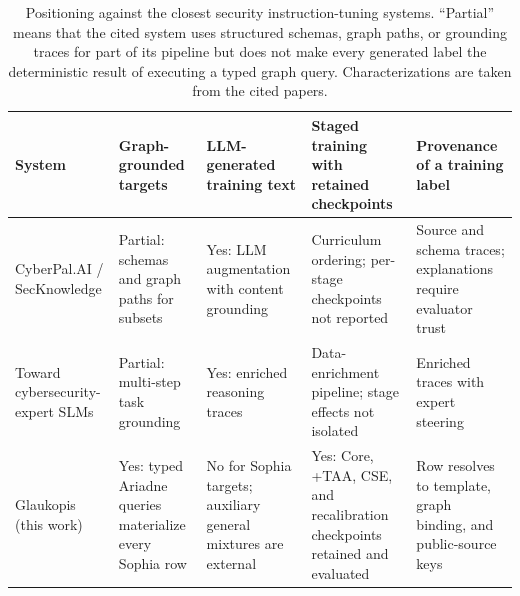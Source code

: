 \documentclass[twocolumn]{svjour3}
\begin{document}
\begin{table}
\centering\footnotesize
\caption{Positioning against the closest security instruction-tuning systems. ``Partial'' means that the cited system uses structured schemas, graph paths, or grounding traces for part of its pipeline but does not make every generated label the deterministic result of executing a typed graph query. Characterizations are taken from the cited papers.}\label{tab:positioning}
\begin{tabularx}{\textwidth}{@{}P{2.6cm}XXXX@{}}
\toprule
System & Graph-grounded targets & LLM-generated training text & Staged training with retained checkpoints & Provenance of a training label \\
\midrule
CyberPal.AI / SecKnowledge \cite{levi2025cyberpal} & Partial: schemas and graph paths for subsets & Yes: LLM augmentation with content grounding & Curriculum ordering; per-stage checkpoints not reported & Source and schema traces; explanations require evaluator trust \\
Toward cybersecurity-expert SLMs \cite{levi2025toward} & Partial: multi-step task grounding & Yes: enriched reasoning traces & Data-enrichment pipeline; stage effects not isolated & Enriched traces with expert steering \\
Glaukopis (this work) & Yes: typed Ariadne queries materialize every Sophia row & No for Sophia targets; auxiliary general mixtures are external & Yes: Core, +TAA, CSE, and recalibration checkpoints retained and evaluated & Row resolves to template, graph binding, and public-source keys \\
\bottomrule
\end{tabularx}
\end{table}
\end{document}
